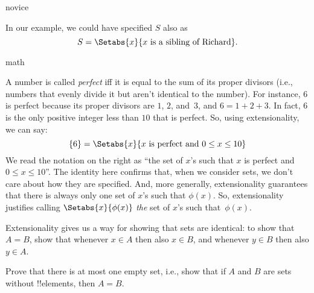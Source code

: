 \documentclass[../../../include/open-logic-section]{subfiles}
\begin{document}
\begin{tagblock}{novice}
\begin{ex}
In our example, we could have specified $S$ also as
\[
S = \Setabs{x}{x \text{ is a sibling of Richard}}.
\]
\end{ex}
\end{tagblock}

\begin{tagblock}{math}
\begin{ex}
A number is called \emph{perfect} iff it is equal to the sum of its
proper divisors (i.e., numbers that evenly divide it but aren't
identical to the number). For instance, $6$ is perfect because its
proper divisors are $1$, $2$, and~$3$, and $6 = 1 + 2 + 3$. In fact,
$6$ is the only positive integer less than $10$ that is perfect. So,
using extensionality, we can say:
\[
	\{6\} = \Setabs{x}{x\text{ is perfect and }0 \leq x \leq 10}
\]
We read the notation on the right as ``the set of $x$'s such that $x$
is perfect and $0 \leq x \leq 10$''. The identity here confirms that,
when we consider sets, we don't care about how they are specified.
And, more generally, extensionality guarantees that there is always
only one set of $x$'s such that $\phi(x)$.
So, extensionality justifies calling 
$\Setabs{x}{\phi(x)}$ \emph{the} set of $x$'s such that~$\phi(x)$.
\end{ex}
\end{tagblock}

Extensionality gives us a way for showing that sets are identical: to
show that $A = B$, show that whenever $x \in A$ then also $x \in B$,
and whenever $y \in B$ then also $y \in A$.

\begin{prob}
Prove that there is at most one empty set, i.e., show that if $A$ and $B$
are sets without !!{element}s, then $A = B$.
\end{prob}
\end{document}
